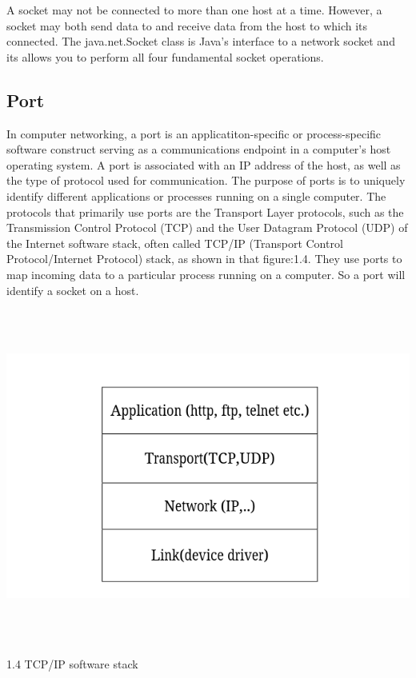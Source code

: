 \documentclass[12pt]{extarticle}
\begin{document}
A socket may not be connected to more than one host at a time. However, a socket may both send data
to and receive data from the host to which its connected. The java.net.Socket class is Java's interface
to a network socket and its allows you to perform all four fundamental socket operations.

\subsection{Port}

In computer networking, a port is an applicatiton-specific or process-specific software construct
serving as a communications endpoint in a computer's host operating system. A port is associated with an
IP address of the host, as well as the type of protocol used for communication.
The purpose of ports is to uniquely identify different applications or processes running on a single computer.
The protocols that primarily use ports are the Transport Layer protocols, such as the Transmission
Control Protocol (TCP) and the User Datagram Protocol (UDP) of the Internet software stack, often
called TCP/IP (Transport Control Protocol/Internet Protocol) stack, as shown in that figure:1.4.
They use ports to map incoming data to a particular process running on a computer. So a port will
identify a socket on a host.


\begin{center}

    \includegraphics[width=15cm, height=11cm]{TCP-IP software stack}
    
        1.4 TCP/IP software stack
    
 \end{center}
\end{document}
